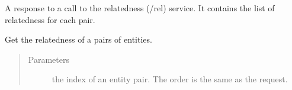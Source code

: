 \documentclass[letterpaper,10pt,english]{sphinxmanual}
\begin{document}
\begin{fulllineitems}
\label{\detokenize{code_comment/tweet_processor:hate_tweet_map.tweets_processor.MyTagMe.RelatednessResponse}}
\sphinxAtStartPar
A response to a call to the relatedness (/rel) service. It contains the list of relatedness for
each pair.

\begin{fulllineitems}
\label{\detokenize{code_comment/tweet_processor:hate_tweet_map.tweets_processor.MyTagMe.RelatednessResponse.get_relatedness}}
\sphinxAtStartPar
Get the relatedness of a pairs of entities.
\begin{quote}\begin{description}
\item[{Parameters}] \leavevmode
\sphinxAtStartPar
{} \textendash{} the index of an entity pair. The order is the same as the request.

\end{description}\end{quote}

\end{fulllineitems}


\end{fulllineitems}

\end{document}
